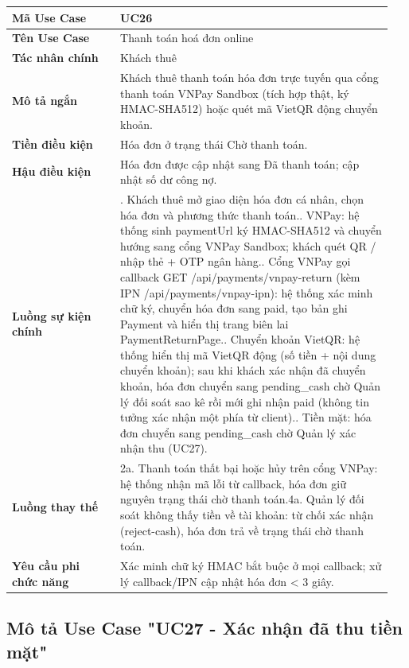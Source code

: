 \begin{longtable}[]{@{}>{\RaggedRight\arraybackslash}p{0.27\linewidth}>{\RaggedRight\arraybackslash}p{0.68\linewidth}@{}}
\toprule
\textbf{Mã Use Case} & UC26\tabularnewline
\midrule
\endhead
\textbf{Tên Use Case} & Thanh toán hoá đơn online\tabularnewline
\textbf{Tác nhân chính} & Khách thuê\tabularnewline
\textbf{Mô tả ngắn} & Khách thuê thanh toán hóa đơn trực tuyến qua cổng
thanh toán VNPay Sandbox (tích hợp thật, ký HMAC-SHA512) hoặc quét mã
VietQR động chuyển khoản.\tabularnewline
\textbf{Tiền điều kiện} & Hóa đơn ở trạng thái Chờ thanh
toán.\tabularnewline
\textbf{Hậu điều kiện} & Hóa đơn được cập nhật sang Đã thanh toán; cập
nhật số dư công nợ.\tabularnewline
\textbf{Luồng sự kiện chính} & 1. Khách thuê mở giao
diện hóa đơn cá nhân, chọn hóa đơn và phương thức thanh
toán.\newline 2. VNPay: hệ thống sinh paymentUrl ký HMAC-SHA512 và
chuyển hướng sang cổng VNPay Sandbox; khách quét QR / nhập thẻ + OTP
ngân hàng.\newline 3. Cổng VNPay gọi callback GET
/api/payments/vnpay-return (kèm IPN /api/payments/vnpay-ipn): hệ thống
xác minh chữ ký, chuyển hóa đơn sang paid, tạo bản ghi Payment và hiển
thị trang biên lai PaymentReturnPage.\newline 4. Chuyển khoản
VietQR: hệ thống hiển thị mã VietQR động (số tiền + nội dung chuyển
khoản); sau khi khách xác nhận đã chuyển khoản, hóa đơn chuyển sang
pending\_cash chờ Quản lý đối soát sao kê rồi mới ghi nhận paid (không
tin tưởng xác nhận một phía từ client).\newline 5. Tiền mặt: hóa
đơn chuyển sang pending\_cash chờ Quản lý xác nhận thu
(UC27).\tabularnewline
\textbf{Luồng thay thế} & 2a. Thanh toán thất bại
hoặc hủy trên cổng VNPay: hệ thống nhận mã lỗi từ callback, hóa đơn giữ
nguyên trạng thái chờ thanh toán.\newline 4a. Quản lý đối soát
không thấy tiền về tài khoản: từ chối xác nhận (reject-cash), hóa đơn
trả về trạng thái chờ thanh toán.\tabularnewline
\textbf{Yêu cầu phi chức năng} & Xác minh chữ ký HMAC bắt buộc ở mọi
callback; xử lý callback/IPN cập nhật hóa đơn \textless{} 3
giây.\tabularnewline
\bottomrule
\end{longtable}

\subsection{Mô tả Use Case "UC27 - Xác nhận đã thu tiền mặt"}

